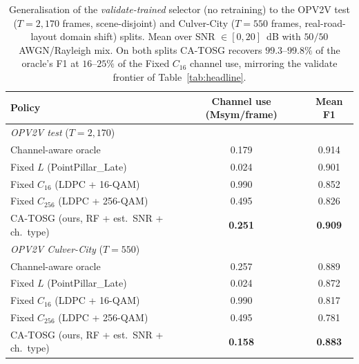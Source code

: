 \documentclass[journal]{IEEEtran}
\newcommand{\method}{CA-TOSG}
\begin{document}
\begin{table}[t]
\centering
\caption{Generalisation of the \emph{validate-trained} selector (no retraining) to the OPV2V test ($T=2{,}170$ frames, scene-disjoint) and Culver-City ($T=550$ frames, real-road-layout domain shift) splits. Mean over SNR $\in[0,20]$~dB with $50/50$ AWGN/Rayleigh mix. On both splits \method{} recovers $99.3$--$99.8\%$ of the oracle's F1 at $16$--$25\%$ of the Fixed $C_{16}$ channel use, mirroring the validate frontier of Table~\ref{tab:headline}.}
\label{tab:gen_headline}
\begin{tabular}{lcc}
\toprule
Policy & Channel use (Msym/frame) & Mean F1 \\
\midrule
\multicolumn{3}{l}{\emph{OPV2V test} ($T=2{,}170$)} \\
Channel-aware oracle           & 0.179 & 0.914 \\
Fixed $L$ (PointPillar\_Late)   & 0.024 & 0.901 \\
Fixed $C_{16}$ (LDPC + 16-QAM)  & 0.990 & 0.852 \\
Fixed $C_{256}$ (LDPC + 256-QAM)& 0.495 & 0.826 \\
\method{} (ours, RF + est.\ SNR + ch.\ type) & \textbf{0.251} & \textbf{0.909} \\
\midrule
\multicolumn{3}{l}{\emph{OPV2V Culver-City} ($T=550$)} \\
Channel-aware oracle           & 0.257 & 0.889 \\
Fixed $L$ (PointPillar\_Late)   & 0.024 & 0.872 \\
Fixed $C_{16}$ (LDPC + 16-QAM)  & 0.990 & 0.817 \\
Fixed $C_{256}$ (LDPC + 256-QAM)& 0.495 & 0.781 \\
\method{} (ours, RF + est.\ SNR + ch.\ type) & \textbf{0.158} & \textbf{0.883} \\
\bottomrule
\end{tabular}
\end{table}
\end{document}
